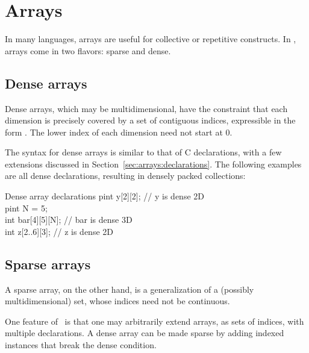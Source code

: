 

\chapter{Arrays}
\label{sec:arrays}

In many languages, arrays are useful for collective or repetitive constructs.  
In \hac, arrays come in two flavors: sparse and dense.  

\section{Dense arrays}
\label{sec:arrays:dense}

Dense arrays, which may be multidimensional, have the constraint that
each dimension is precisely covered by a set of contiguous indices, 
expressible in the form \ttt{[a..x][b..y]}.
The lower index of each dimension need not start at $0$.  

The syntax for dense arrays is similar to that of C declarations,
with a few extensions discussed in Section~\ref{sec:arrays:declarations}.
The following examples are all dense declarations, resulting in
densely packed collections:

\begin{example}{Dense array declarations}
pint y[2][2];      // y is dense 2D\\
pint N = 5;\\
int bar[4][5][N];  // bar is dense 3D\\
int z[2..6][3];    // z is dense 2D
\end{example}

\section{Sparse arrays}
\label{sec:arrays:sparse}

A sparse array, on the other hand, is a generalization of a 
(possibly multidimensional) set, whose indices need not be continuous.  

One feature of \hac\ is that one may arbitrarily extend 
arrays, as sets of indices, with multiple declarations.  
A dense array can be made sparse by adding indexed instances that
break the dense condition.

